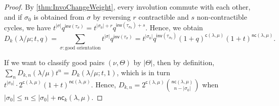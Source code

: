 \documentclass[pdflatex,sn-mathphys-num]{sn-jnl}%
\theoremstyle{thmstyleone}%
\theoremstyle{thmstyletwo}%
\theoremstyle{thmstylethree}%
\numberwithin{equation}{section}
\newcommand{\inv}{\mathsf{inv}}
\begin{document}
        \begin{proof}
            By \cref{thm:InvoChangeWeight}, every involution commute with each other, and if $\sigma_0$ is obtained from $\sigma$ by reversing $r$ contractible and $s$ non-contractible cycles, we have $t^{|\sigma|}q^{\inv(\tau_{\sigma})}=t^{|\sigma_0|+r}q^{\inv(\tau_{\sigma_0})+s}$. Hence, we obtain 
            \[D_k(\lambda/\mu; t,q)=\sum_{\sigma:\text{good orientation}}t^{|\sigma|}q^{\inv(\tau_{\sigma})}=t^{|\sigma_0|}q^{\inv(\tau_{\sigma_0})}(1+q)^{\mathsf{c}(\lambda,\mu)}(1+t)^{\mathsf{nc}(\lambda,\mu)}.\]

            If we want to classify good pairs $(\nu,\Theta)$ by $|\Theta|$, then by definition, $\sum_{n}D_{k,n}(\lambda/\mu) t^n =D_k(\lambda/\mu; t,1)$, which is in turn $t^{|\sigma_0|}\cdot 2^{\mathsf{c}(\lambda,\mu)}(1+t)^{\mathsf{nc}(\lambda,\mu)}$. Hence, $D_{k,n}=2^{\mathsf{c}(\lambda,\mu)} 
            \binom{\mathsf{nc}(\lambda,\mu)}{n-|\sigma_0|}$ when $|\sigma_0|\leq n\leq |\sigma_0|+\mathsf{nc}_k(\lambda,\mu)$.
        \end{proof}
    
\end{document}
